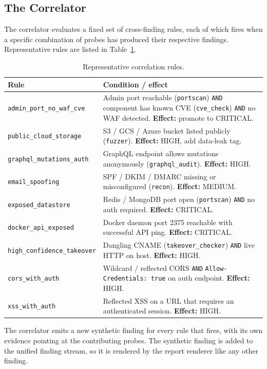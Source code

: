 \subsection{The Correlator}

The correlator evaluates a fixed set of cross-finding rules, each of which fires when a specific combination of probes has produced their respective findings. Representative rules are listed in Table~\ref{tab:correlation-rules}.

\begin{table}[h]
\centering
\small
\begin{tabular}{|p{4.8cm}|p{8.2cm}|}
\hline
\textbf{Rule} & \textbf{Condition / effect} \\
\hline
\texttt{admin\_port\_no\_waf\_cve} & Admin port reachable (\texttt{portscan}) \texttt{AND} component has known CVE (\texttt{cve\_check}) \texttt{AND} no WAF detected. \textbf{Effect:} promote to CRITICAL. \\
\texttt{public\_cloud\_storage} & S3 / GCS / Azure bucket listed publicly (\texttt{fuzzer}). \textbf{Effect:} HIGH, add data-leak tag. \\
\texttt{graphql\_mutations\_auth} & GraphQL endpoint allows mutations anonymously (\texttt{graphql\_audit}). \textbf{Effect:} HIGH. \\
\texttt{email\_spoofing} & SPF / DKIM / DMARC missing or misconfigured (\texttt{recon}). \textbf{Effect:} MEDIUM. \\
\texttt{exposed\_datastore} & Redis / MongoDB port open (\texttt{portscan}) \texttt{AND} no auth required. \textbf{Effect:} CRITICAL. \\
\texttt{docker\_api\_exposed} & Docker daemon port 2375 reachable with successful API ping. \textbf{Effect:} CRITICAL. \\
\texttt{high\_confidence\_takeover} & Dangling CNAME (\texttt{takeover\_checker}) \texttt{AND} live HTTP on host. \textbf{Effect:} HIGH. \\
\texttt{cors\_with\_auth} & Wildcard / reflected CORS \texttt{AND} \texttt{Allow-Credentials: true} on auth endpoint. \textbf{Effect:} HIGH. \\
\texttt{xss\_with\_auth} & Reflected XSS on a URL that requires an authenticated session. \textbf{Effect:} HIGH. \\
\hline
\end{tabular}
\caption{Representative correlation rules.}
\label{tab:correlation-rules}
\end{table}

The correlator emits a new synthetic finding for every rule that fires, with its own evidence pointing at the contributing probes. The synthetic finding is added to the unified finding stream, so it is rendered by the report renderer like any other finding.

